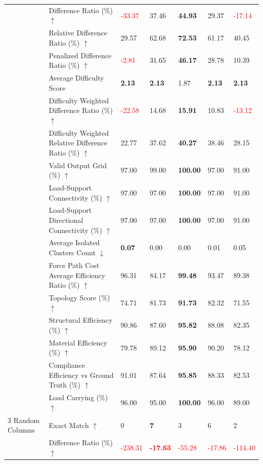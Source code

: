 \begin{table}[!h]
{\begin{tabular}{lllllll}
 & Difference Ratio (\%) $\uparrow$ & \textcolor{red}{-33.37} & 37.46 & \textbf{44.93} & 29.37 & \textcolor{red}{-17.14} \\
 & Relative Difference Ratio (\%) $\uparrow$ & 29.57 & 62.68 & \textbf{72.53} & 61.17 & 40.45 \\
 & Penalized Difference Ratio (\%) $\uparrow$ & \textcolor{red}{-2.81} & 31.65 & \textbf{46.17} & 28.78 & 10.39 \\
 & Average Difficulty Score & \textbf{2.13} & \textbf{2.13} & 1.87 & \textbf{2.13} & \textbf{2.13} \\
 & Difficulty Weighted Difference Ratio (\%) $\uparrow$ & \textcolor{red}{-22.58} & 14.68 & \textbf{15.91} & 10.83 & \textcolor{red}{-13.12} \\
 & Difficulty Weighted Relative Difference Ratio (\%) $\uparrow$ & 22.77 & 37.62 & \textbf{40.27} & 38.46 & 28.15 \\
 & Valid Output Grid (\%) $\uparrow$ & 97.00 & 99.00 & \textbf{100.00} & 97.00 & 91.00 \\
 & Load-Support Connectivity (\%) $\uparrow$ & 97.00 & 97.00 & \textbf{100.00} & 97.00 & 91.00 \\
 & Load-Support Directional Connectivity (\%) $\uparrow$ & 97.00 & 97.00 & \textbf{100.00} & 97.00 & 91.00 \\
 & Average Isolated Clusters Count $\downarrow$ & \textbf{0.07} & 0.00 & 0.00 & 0.01 & 0.05 \\
 & Force Path Cost Average Efficiency Ratio (\%) $\uparrow$ & 96.31 & 84.17 & \textbf{99.48} & 93.47 & 89.38 \\
 & Topology Score (\%) $\uparrow$ & 74.71 & 81.73 & \textbf{91.73} & 82.32 & 71.55 \\
 & Structural Efficiency (\%) $\uparrow$ & 90.86 & 87.60 & \textbf{95.82} & 88.08 & 82.35 \\
 & Material Efficiency (\%) $\uparrow$ & 79.78 & 89.12 & \textbf{95.90} & 90.20 & 78.12 \\
 & Compliance Efficiency vs Ground Truth (\%) $\uparrow$ & 91.01 & 87.64 & \textbf{95.85} & 88.33 & 82.53 \\
 & Load Carrying (\%) $\uparrow$ & 96.00 & 95.00 & \textbf{100.00} & 96.00 & 89.00 \\
3 Random Columns & Exact Match $\uparrow$ & 0 & \textbf{7} & 3 & 6 & 2 \\
 & Difference Ratio (\%) $\uparrow$ & \textcolor{red}{-238.31} & \textbf{\textcolor{red}{-17.63}} & \textcolor{red}{-55.28} & \textcolor{red}{-17.86} & \textcolor{red}{-114.40} \\

\end{tabular}}
\end{table}
